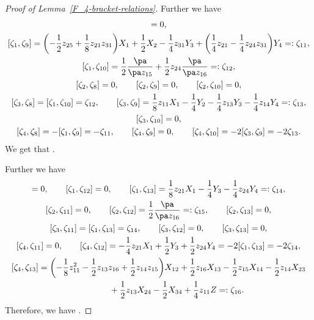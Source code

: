 \begin{proof}[Proof of Lemma~\ref{F_4-bracket-relations}]
Further we have
\begin{gather*}
[\zeta_1, \zeta_8] = 0,\\
[\zeta_1, \zeta_9] = \biggl(-\frac{1}{2}z_{25} + \frac{1}{8}z_{21}z_{31}\biggr)X_1 + \frac{1}{2}X_2 - \frac{1}{4}z_{31}Y_3 + \biggl(\frac{1}{4}z_{21} - \frac{1}{4}z_{24}z_{31}\biggr)Y_4 =: \zeta_{11},
\\
[\zeta_1, \zeta_{10}] = \frac{1}{2}\frac{\pa}{\pa z_{15}} + \frac{1}{2}z_{24}\frac{\pa}{\pa z_{16}} =: \zeta_{12},
\\
[\zeta_2, \zeta_8] = 0, \qquad [\zeta_2, \zeta_9] = 0, \qquad [\zeta_2, \zeta_{10}] = 0,
\\
[\zeta_3, \zeta_8] = [\zeta_1, \zeta_{10}] = \zeta_{12}, \qquad
[\zeta_3, \zeta_9] = \frac{1}{8}z_{11}X_1 - \frac{1}{4}Y_2 - \frac{1}{4}z_{13}Y_3 - \frac{1}{4}z_{14}Y_4 =: \zeta_{13}, \\ [\zeta_3, \zeta_{10}] = 0,
\\
[\zeta_4, \zeta_8] = - [\zeta_1, \zeta_9] = - \zeta_{11}, \qquad [\zeta_4, \zeta_9] =0, \qquad
[\zeta_4, \zeta_{10}] = -2[\zeta_3, \zeta_9] = -2\zeta_{13}.
\end{gather*}
We get that .


Further we have
\begin{gather*}
[\zeta_1, \zeta_{11}] = 0, \qquad [\zeta_1, \zeta_{12}] = 0, \qquad
[\zeta_1, \zeta_{13}] = \frac{1}{8}z_{21}X_1 - \frac{1}{4}Y_3 - \frac{1}{4}z_{24}Y_4 =: \zeta_{14},\\
[\zeta_2, \zeta_{11}] = 0,\qquad
[\zeta_2, \zeta_{12}] = \frac{1}{2}\frac{\pa}{\pa z_{16}} =: \zeta_{15}, \qquad [\zeta_2, \zeta_{13}] = 0, \\
[\zeta_3, \zeta_{11}] = [\zeta_1, \zeta_{13}] = \zeta_{14}, \qquad [\zeta_3, \zeta_{12}] = 0,\qquad
[\zeta_3, \zeta_{13}] = 0, \\
[\zeta_4, \zeta_{11}] = 0, \qquad
[\zeta_4, \zeta_{12}] = - \frac{1}{4}z_{21}X_1 + \frac{1}{2}Y_3 + \frac{1}{2}z_{24}Y_4 = -2[\zeta_1, \zeta_{13}] =
-2\zeta_{14},\\
[\zeta_4, \zeta_{13}] = \biggl(-\frac{1}{8}z_{11}^2 - \frac{1}{2}z_{13}z_{16} + \frac{1}{2}z_{14}z_{15}\biggr)X_{12}
+ \frac{1}{2}z_{16}X_{13} - \frac{1}{2}z_{15}X_{14} - \frac{1}{2}z_{14}X_{23}\\
\hphantom{[\zeta_4, \zeta_{13}] =}{}
 + \frac{1}{2}z_{13}X_{24} - \frac{1}{2}X_{34} + \frac{1}{4}z_{11}Z =: \zeta_{16}.
\end{gather*}
Therefore, we have .


\end{proof}
